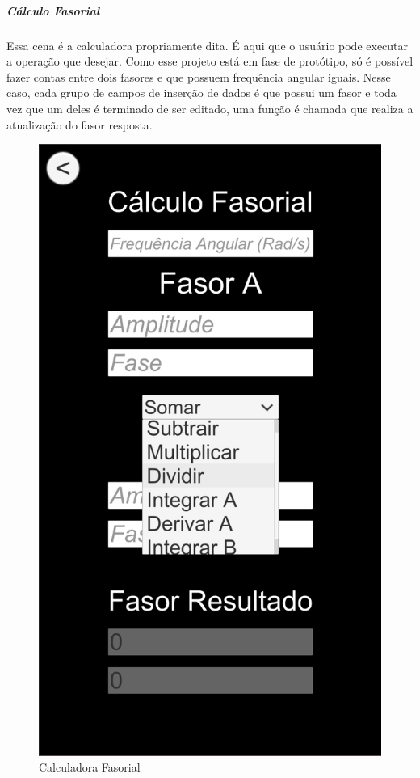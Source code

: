 \documentclass[conference,harvard, brazil]{sbatex}
\begin{document}
	\subparagraph{Cálculo Fasorial}Essa cena é a calculadora propriamente dita. É aqui que o usuário pode executar a operação que desejar. Como esse projeto está em fase de protótipo, só é possível fazer contas entre dois fasores e que possuem frequência angular iguais. Nesse caso, cada grupo de campos de inserção de dados é que possui um fasor e toda vez que um deles é terminado de ser editado, uma função é chamada que realiza a atualização do fasor resposta.
	\begin{figure}[h]
		\centering
		\includegraphics[scale=0.25]{app_3}
		\caption{Calculadora Fasorial}
	\end{figure}
	
\end{document}
